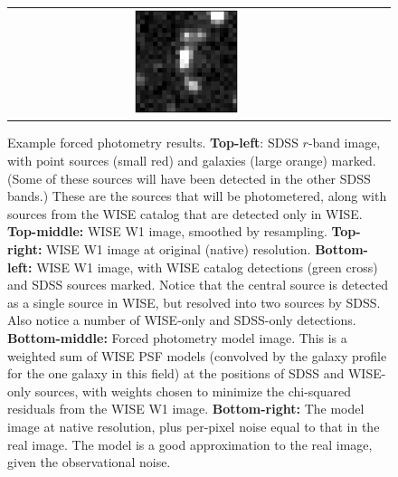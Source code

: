 \documentclass[12pt,preprint]{aastex}
\begin{document}
\begin{figure}
\begin{center}
\begin{tabular}{ccc}
  \includegraphics[width=0.3\textwidth]{model-34}
\end{tabular}
\end{center}
\caption{Example forced photometry results.  \textbf{Top-left}: SDSS
  $r$-band image, with point sources (small red) and galaxies (large
  orange) marked.  (Some of these sources will have been detected in
  the other SDSS bands.)  These are the sources that will be
  photometered, along with sources from the WISE catalog that are
  detected only in WISE.  \textbf{Top-middle:} WISE W1 image, smoothed
  by resampling.  \textbf{Top-right:} WISE W1 image at original
  (native) resolution.  \textbf{Bottom-left:} WISE W1 image, with WISE
  catalog detections (green cross) and SDSS sources marked.  Notice
  that the central source is detected as a single source in WISE, but
  resolved into two sources by SDSS.  Also notice a number of
  WISE-only and SDSS-only detections.  \textbf{Bottom-middle:} Forced
  photometry model image.  This is a weighted sum of WISE PSF models
  (convolved by the galaxy profile for the one galaxy in this field)
  at the positions of SDSS and WISE-only sources, with weights chosen
  to minimize the chi-squared residuals from the WISE W1 image.
  \textbf{Bottom-right:} The model image at native resolution, plus
  per-pixel noise equal to that in the real image.  The model is a
  good approximation to the real image, given the observational noise.
  \label{fig:demo}}
\end{figure}
\end{document}
